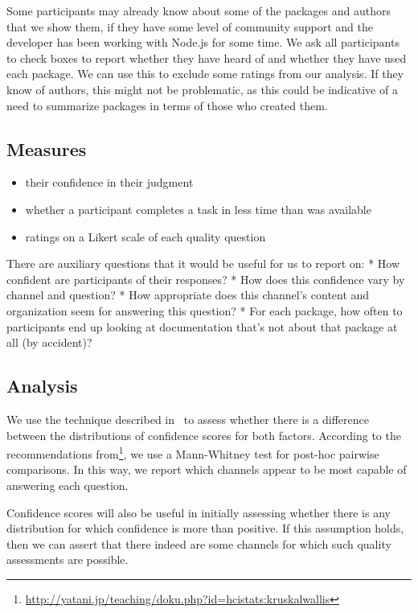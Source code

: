 Some participants may already know about some of the packages and authors that we show them, if they have some level of community support and the developer has been working with Node.js for some time.
We ask all participants to check boxes to report whether they have heard of and whether they have used each package.
 We can use this to exclude some ratings from our analysis.
 If they know of authors, this might not be problematic, as this could be indicative of a need to summarize packages in terms of those who created them.
\fi
{}
\subsection{Measures}

\begin{itemize}
\item their confidence in their judgment
\item whether a participant completes a task in less time than was available 
\item ratings on a Likert scale of each quality question
\end{itemize}

There are auxiliary questions that it would be useful for us to report on:
* How confident are participants of their responses?
* How does this confidence vary by channel and question?
* How appropriate does this channel's content and organization seem for answering this question?
* For each package, how often to participants end up looking at documentation that's not about that package at all (by accident)?

\subsection{Analysis}

We use the technique described in~\cite{kaptein_powerful_2010} to assess whether there is a difference between the distributions of confidence scores for both factors.
According to the recommendations from\footnote{\url{http://yatani.jp/teaching/doku.php?id=hcistats:kruskalwallis}}, we use a Mann-Whitney test for post-hoc pairwise comparisons.
In this way, we report which channels appear to be most capable of answering each question.

Confidence scores will also be useful in initially assessing whether there is any distribution for which confidence is more than positive.
If this assumption holds, then we can assert that there indeed are some channels for which such quality assessments are possible.

